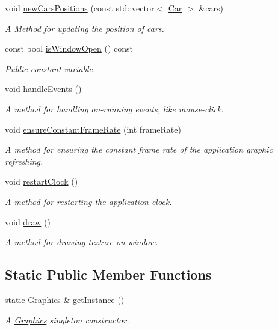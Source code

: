 \begin{DoxyCompactItemize}
void \hyperlink{classGraphics_a5f2e6a6cc8dffc34b48e66df42046243}{new\+Cars\+Positions} (const std\+::vector$<$ \hyperlink{classCar}{Car} $>$ \&cars)
\begin{DoxyCompactList}\small\item\em A Method for updating the position of cars. \end{DoxyCompactList}\item 
const bool \hyperlink{classGraphics_a21729e7f5db9080db1a766682e64c43a}{is\+Window\+Open} () const
\begin{DoxyCompactList}\small\item\em Public constant variable. \end{DoxyCompactList}\item 
void \hyperlink{classGraphics_abad4212fb355b9b3d6504ad019832213}{handle\+Events} ()
\begin{DoxyCompactList}\small\item\em A method for handling on-\/running events, like mouse-\/click. \end{DoxyCompactList}\item 
void \hyperlink{classGraphics_a283310b7fe274dab0544d307525198dc}{ensure\+Constant\+Frame\+Rate} (int frame\+Rate)
\begin{DoxyCompactList}\small\item\em A method for ensuring the constant frame rate of the application graphic refreshing. \end{DoxyCompactList}\item 
void \hyperlink{classGraphics_abb78da7bc406f5c9518f7fd3f20b42f8}{restart\+Clock} ()
\begin{DoxyCompactList}\small\item\em A method for restarting the application clock. \end{DoxyCompactList}\item 
void \hyperlink{classGraphics_ad0e7c12771870690d603e9df6643542c}{draw} ()
\begin{DoxyCompactList}\small\item\em A method for drawing texture on window. \end{DoxyCompactList}\end{DoxyCompactItemize}
\subsection*{Static Public Member Functions}
\begin{DoxyCompactItemize}
\item 
static \hyperlink{classGraphics}{Graphics} \& \hyperlink{classGraphics_a115d78c8686f6c82add227bf1fe2c81c}{get\+Instance} ()
\begin{DoxyCompactList}\small\item\em A \hyperlink{classGraphics}{Graphics} singleton constructor. \end{DoxyCompactList}\end{DoxyCompactItemize}
